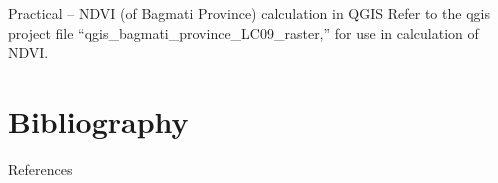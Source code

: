 \documentclass[11pt,dvipsnames,ignorenonframetext,aspectratio=169]{beamer}
\begin{document}
\begin{frame}{Practical -- NDVI (of Bagmati Province) calculation in
QGIS}
\protect\hypertarget{practical-ndvi-of-bagmati-province-calculation-in-qgis}{}
Refer to the qgis project file
``qgis\_bagmati\_province\_LC09\_raster,'' for use in calculation of
NDVI.
\end{frame}

\hypertarget{bibliography}{%
\section{Bibliography}\label{bibliography}}

\begin{frame}{References}
\protect\hypertarget{references}{}
\end{frame}
\end{document}
